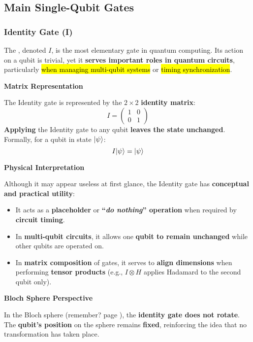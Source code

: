 \subsection{Main Single-Qubit Gates}

\subsubsection{Identity Gate (I)}

The , denoted $I$, is the most elementary gate in quantum computing. Its action on a qubit is trivial, yet it \textbf{serves important roles in quantum circuits}, particularly \hl{when managing multi-qubit systems} or \hl{timing synchronization}.

\highspace
\begin{flushleft}
    \textcolor{Green3}{ \textbf{Matrix Representation}}
\end{flushleft}
The Identity gate is represented by the $2 \times 2$ \textbf{identity matrix}:
\begin{equation}
    I = \begin{pmatrix}
        1 & 0 \\ 0 & 1
    \end{pmatrix}
\end{equation}
\textbf{Applying} the Identity gate to any qubit \textbf{leaves the state unchanged}. Formally, for a qubit in state $| \psi \rangle$:
\begin{equation*}
    I | \psi \rangle = | \psi \rangle
\end{equation*}

\highspace
\begin{flushleft}
    \textcolor{Green3}{ \textbf{Physical Interpretation}}
\end{flushleft}
Although it may appear useless at first glance, the Identity gate has \textbf{conceptual and practical utility}:
\begin{itemize}[label=\textcolor{Green3}{}]
    \item It acts as a \textbf{placeholder} or \textbf{``\emph{do nothing}'' operation} when required by \textbf{circuit timing}.
    \item In \textbf{multi-qubit circuits}, it allows one \textbf{qubit to remain unchanged} while other qubits are operated on.
    \item In \textbf{matrix composition} of gates, it serves to \textbf{align dimensions} when performing \textbf{tensor products} (e.g., $I \otimes H$ applies Hadamard to the second qubit only).
\end{itemize}

\highspace
\begin{flushleft}
    \textcolor{Green3}{ \textbf{Bloch Sphere Perspective}}
\end{flushleft}
In the Bloch sphere (remember? page \pageref{fig: Bloch sphere representation of qubit}), the \textbf{identity gate does not rotate}. The \textbf{qubit's position} on the sphere remains \textbf{fixed}, reinforcing the idea that no transformation has taken place.
